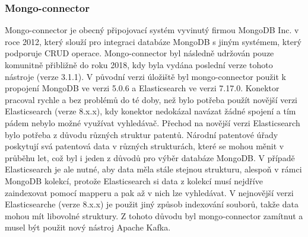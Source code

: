 \subsubsection{Mongo-connector}
Mongo-connector je obecný připojovací systém vyvinutý firmou MongoDB Inc. v roce 2012, který slouží pro integraci databáze MongoDB s jiným systémem, který podporuje \gls{CRUD} operace. Mongo-connector byl následně udržován pouze komunitně přibližně do roku 2018, kdy byla vydána poslední verze tohoto nástroje (verze 3.1.1).
\newline
\indent V původní verzi úložiště byl mongo-connector použit k propojení MongoDB ve verzi 5.0.6 a Elasticsearch ve verzi 7.17.0. Konektor pracoval rychle a bez problémů do té doby, než bylo potřeba použít novější verzi Elasticsearch (verze 8.x.x), kdy konektor nedokázal navázat žádné spojení a tím pádem nebylo možné využívat vyhledávač.
\newline
\indent Přechod na novější verzi Elasticsearch bylo potřeba z důvodu různých struktur patentů. Národní patentové úřady poskytují svá patentová data v různých strukturách, které se mohou měnit v průběhu let, což byl i jeden z důvodů pro výběr databáze MongoDB. V případě Elasticsearch je ale nutné, aby data měla stále stejnou strukturu, alespoň v rámci MongoDB kolekcí, protože Elasticsearch si data z kolekcí musí nejdříve zaindexovat pomocí mapperu a pak až v nich lze vyhledávat. V nejnovější verzi Elasticsearche (verze 8.x.x) je použit jiný způsob indexování souborů, takže data mohou mít libovolné struktury. Z tohoto důvodu byl mongo-connector zamítnut a musel být použit nový nástroj Apache Kafka.

